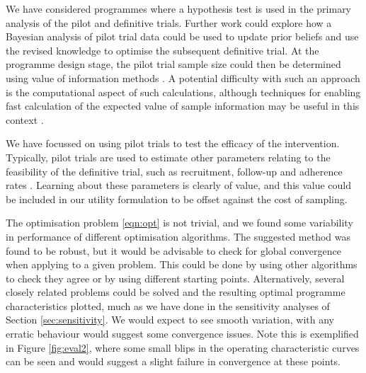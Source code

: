 \documentclass[sagev, Crown]{sagej} %
\begin{document}
We have considered programmes where a hypothesis test is used in the primary analysis of the pilot and definitive trials. Further work could explore how a Bayesian analysis of pilot trial data could be used to update prior beliefs and use the revised knowledge to optimise the subsequent definitive trial. At the programme design stage, the pilot trial sample size could then be determined using value of information methods \cite{Willan2005}. A potential difficulty with such an approach is the computational aspect of such calculations, although techniques for enabling fast calculation of the expected value of sample information may be useful in this context \cite{Strong2015, Heath2019}. 

We have focussed on using pilot trials to test the efficacy of the intervention. Typically, pilot trials are used to estimate other parameters relating to the feasibility of the definitive trial, such as recruitment, follow-up and adherence rates \cite{Avery2017}. Learning about these parameters is clearly of value, and this value could be included in our utility formulation to be offset against the cost of sampling.

The optimisation problem \ref{eqn:opt} is not trivial, and we found some variability in performance of different optimisation algorithms. The suggested method was found to be robust, but it would be advisable to check for global convergence when applying to a given problem. This could be done by using other algorithms to check they agree or by using different starting points. Alternatively, several closely related problems could be solved and the resulting optimal programme characteristics plotted, much as we have done in the sensitivity analyses of Section \ref{sec:sensitivity}. We would expect to see smooth variation, with any erratic behaviour would suggest some convergence issues. Note this is exemplified in Figure \ref{fig:eval2}, where some small blips in the operating characteristic curves can be seen and would suggest a slight failure in convergence at these points.

\end{document}
